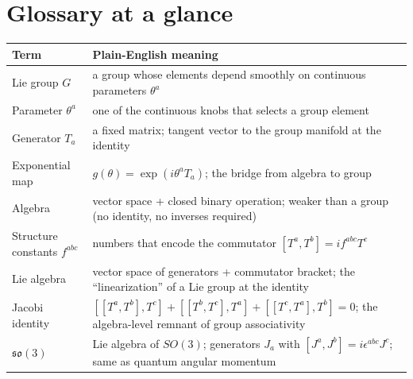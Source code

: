 \documentclass[11pt]{article}
\begin{document}
\section*{Glossary at a glance}

\begin{table}[H]
\centering
\renewcommand{\arraystretch}{1.3}
\begin{tabular}{@{}lp{11cm}@{}}
\toprule
\textbf{Term} & \textbf{Plain-English meaning} \\
\midrule
Lie group $G$ & a group whose elements depend smoothly on continuous
                parameters $\theta^a$ \\
Parameter $\theta^a$ & one of the continuous knobs that selects a group
                       element \\
Generator $T_a$ & a fixed matrix; tangent vector to the group manifold
                  at the identity \\
Exponential map & $g(\theta) = \exp(i\theta^a T_a)$; the bridge from
                  algebra to group \\
Algebra & vector space + closed binary operation; weaker than a group
          (no identity, no inverses required) \\
Structure constants $f^{abc}$ & numbers that encode the commutator
                                $[T^a, T^b] = i f^{abc} T^c$ \\
Lie algebra & vector space of generators + commutator bracket; the
              ``linearization'' of a Lie group at the identity \\
Jacobi identity & $[[T^a,T^b],T^c]+[[T^b,T^c],T^a]+[[T^c,T^a],T^b]=0$;
                  the algebra-level remnant of group associativity \\
$\mathfrak{so}(3)$ & Lie algebra of $SO(3)$; generators $J_a$ with
                     $[J^a,J^b] = i\epsilon^{abc} J^c$; same as quantum
                     angular momentum \\
\bottomrule
\end{tabular}
\end{table}
\end{document}
